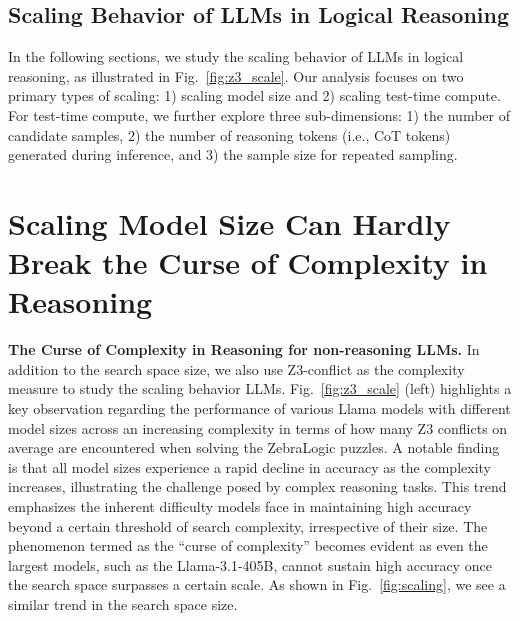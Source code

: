 
\subsection{Scaling Behavior of LLMs in Logical Reasoning}

In the following sections, we study the scaling behavior of LLMs in logical reasoning, as illustrated in Fig.~\ref{fig:z3_scale}. Our analysis focuses on two primary types of scaling: 1) scaling model size and 2) scaling test-time compute. For test-time compute, we further explore three sub-dimensions: 1) the number of candidate samples, 2) the number of reasoning tokens (i.e., CoT tokens) generated during inference, and 3) the sample size for repeated sampling.



\section{Scaling Model Size Can Hardly Break the Curse of Complexity in Reasoning}
\label{sec:size_scale}




\textbf{The Curse of Complexity in Reasoning for non-reasoning LLMs.}
In addition to the search space size, we also use Z3-conflict as the complexity measure to study the scaling behavior LLMs.
Fig.~\ref{fig:z3_scale} (left) highlights a key observation regarding the performance of various Llama models with different model sizes across an increasing complexity in terms of how many Z3 conflicts on average are encountered when solving the ZebraLogic puzzles. 
A notable finding is that all model sizes experience a rapid decline in accuracy as the complexity increases, illustrating the challenge posed by complex reasoning tasks. This trend emphasizes the inherent difficulty models face in maintaining high accuracy beyond a certain threshold of search complexity, irrespective of their size. The phenomenon termed as the ``curse of complexity'' becomes evident as even the largest models, such as the Llama-3.1-405B, cannot sustain high accuracy once the search space surpasses a certain scale.
As shown in Fig.~\ref{fig:scaling}, we see a similar trend in the search space size. 



